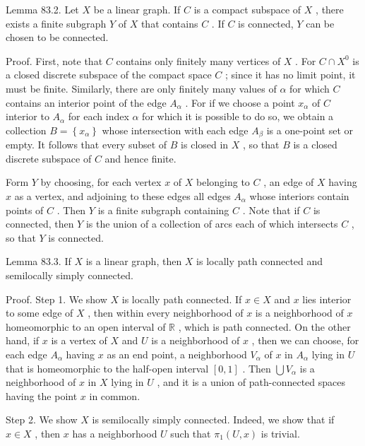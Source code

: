 \documentclass[10pt]{article}
\begin{document}
Lemma 83.2. Let \(X\) be a linear graph. If \(C\) is a compact subspace of \(X\) , there exists a finite subgraph \(Y\) of \(X\) that contains \(C\) . If \(C\) is connected, \(Y\) can be chosen to be connected.

Proof. First, note that \(C\) contains only finitely many vertices of \(X\) . For \(C \cap  {X}^{0}\) is a closed discrete subspace of the compact space \(C\) ; since it has no limit point, it must be finite. Similarly, there are only finitely many values of \(\alpha\) for which \(C\) contains an interior point of the edge \({A}_{\alpha }\) . For if we choose a point \({x}_{\alpha }\) of \(C\) interior to \({A}_{\alpha }\) for each index \(\alpha\) for which it is possible to do so, we obtain a collection \(B = \left\{  {x}_{\alpha }\right\}\) whose intersection with each edge \({A}_{\beta }\) is a one-point set or empty. It follows that every subset of \(B\) is closed in \(X\) , so that \(B\) is a closed discrete subspace of \(C\) and hence finite.

Form \(Y\) by choosing, for each vertex \(x\) of \(X\) belonging to \(C\) , an edge of \(X\) having \(x\) as a vertex, and adjoining to these edges all edges \({A}_{\alpha }\) whose interiors contain points of \(C\) . Then \(Y\) is a finite subgraph containing \(C\) . Note that if \(C\) is connected, then \(Y\) is the union of a collection of arcs each of which intersects \(C\) , so that \(Y\) is connected.

Lemma 83.3. If \(X\) is a linear graph, then \(X\) is locally path connected and semilocally simply connected.

Proof. Step 1. We show \(X\) is locally path connected. If \(x \in  X\) and \(x\) lies interior to some edge of \(X\) , then within every neighborhood of \(x\) is a neighborhood of \(x\) homeomorphic to an open interval of \(\mathbb{R}\) , which is path connected. On the other hand, if \(x\) is a vertex of \(X\) and \(U\) is a neighborhood of \(x\) , then we can choose, for each edge \({A}_{\alpha }\) having \(x\) as an end point, a neighborhood \({V}_{\alpha }\) of \(x\) in \({A}_{\alpha }\) lying in \(U\) that is homeomorphic to the half-open interval \(\left\lbrack  {0,1}\right\rbrack\) . Then \(\bigcup {V}_{\alpha }\) is a neighborhood of \(x\) in \(X\) lying in \(U\) , and it is a union of path-connected spaces having the point \(x\) in common.

Step 2. We show \(X\) is semilocally simply connected. Indeed, we show that if \(x \in  X\) , then \(x\) has a neighborhood \(U\) such that \({\pi }_{1}\left( {U,x}\right)\) is trivial.
\end{document}
